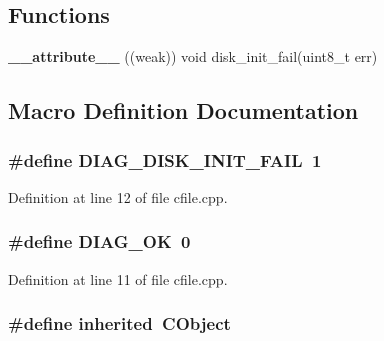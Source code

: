 \subsection*{Functions}
\begin{DoxyCompactItemize}
\item 
{\bf \-\_\-\-\_\-attribute\-\_\-\-\_\-} ((weak)) void disk\-\_\-init\-\_\-fail(uint8\-\_\-t err)
\end{DoxyCompactItemize}


\subsection{Macro Definition Documentation}
\subsubsection[{D\-I\-A\-G\-\_\-\-D\-I\-S\-K\-\_\-\-I\-N\-I\-T\-\_\-\-F\-A\-I\-L}]{\setlength{\rightskip}{0pt plus 5cm}\#define D\-I\-A\-G\-\_\-\-D\-I\-S\-K\-\_\-\-I\-N\-I\-T\-\_\-\-F\-A\-I\-L~1}\label{cfile_8cpp_a5f5548e3ed623d35937530cbf51bff93}


Definition at line 12 of file cfile.\-cpp.

\subsubsection[{D\-I\-A\-G\-\_\-\-O\-K}]{\setlength{\rightskip}{0pt plus 5cm}\#define D\-I\-A\-G\-\_\-\-O\-K~0}\label{cfile_8cpp_ae283178a6a32f9874ad70c3c07b67fcf}


Definition at line 11 of file cfile.\-cpp.

\subsubsection[{inherited}]{\setlength{\rightskip}{0pt plus 5cm}\#define inherited~C\-Object}\label{cfile_8cpp_a3920e3b7cb0909b941b2409493acf8f1}


